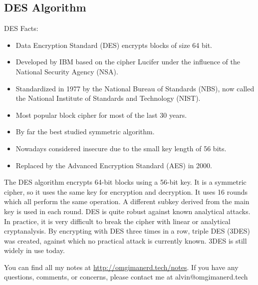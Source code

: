 \documentclass{math}
\begin{document}
\subsection*{DES Algorithm}
DES Facts:
\begin{itemize}
  \item Data Encryption Standard (DES) encrypts blocks of size 64 bit.
  \item Developed by IBM based on the cipher Lucifer under the influence of the
  National Security Agency (NSA).
  \item Standardized in 1977 by the National Bureau of Standards (NBS), now
  called the National Institute of Standards and Technology (NIST).
  \item Most popular block cipher for most of the last 30 years.
  \item By far the best studied symmetric algorithm.
  \item Nowadays considered insecure due to the small key length of 56 bits.
  \item Replaced by the Advanced Encryption Standard (AES) in 2000.
\end{itemize}
The DES algorithm encrypts 64-bit blocks using a 56-bit key. It is a symmetric
cipher, so it uses the same key for encryption and decryption. It uses 16 rounds
which all perform the same operation. A different subkey derived from the main
key is used in each round. DES is quite robust against known analytical attacks.
In practice, it is very difficult to break the cipher with linear or analytical
cryptanalysis. By encrypting with DES three times in a row, triple DES (3DES)
was created, against which no practical attack is currently known. 3DES is still
widely in use today.

\begin{center}
  You can find all my notes at \url{http://omgimanerd.tech/notes}. If you have
  any questions, comments, or concerns, please contact me at
  alvin@omgimanerd.tech
\end{center}
\end{document}
